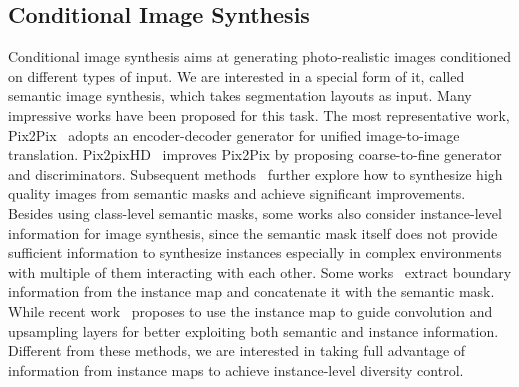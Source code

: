 \documentclass[final]{cvpr}
\begin{document}
\subsection{Conditional Image Synthesis}
Conditional image synthesis aims at generating photo-realistic images conditioned on different types of input. We are interested in a special form of it, called semantic image synthesis, which takes segmentation layouts as input. Many impressive works have been proposed for this task. The most representative work, Pix2Pix~\cite{isola2017image} adopts an encoder-decoder generator for unified image-to-image translation. Pix2pixHD~\cite{wang2018high} improves Pix2Pix by proposing coarse-to-fine generator and discriminators. 
Subsequent methods~\cite{qi2018semi,liu2019learning,tang2020dual,zhang2020cross,tan2020semantic,zhu2020sean} further explore how to synthesize high quality images from semantic masks and achieve significant improvements.
Besides using class-level semantic masks, some works also consider instance-level information for image synthesis, since the semantic mask itself does not provide sufficient information to synthesize instances especially in complex environments with multiple of them interacting with each other. 
Some works~\cite{wang2018high,park2019semantic,tan2020semantic} extract boundary information from the instance map and concatenate it with the semantic mask. While recent work~\cite{dundar2020panoptic} proposes to use the instance map to guide convolution and upsampling layers for better exploiting both semantic and instance information. 
Different from these methods, we are interested in taking full advantage of information from instance maps to achieve instance-level diversity control.
\end{document}
